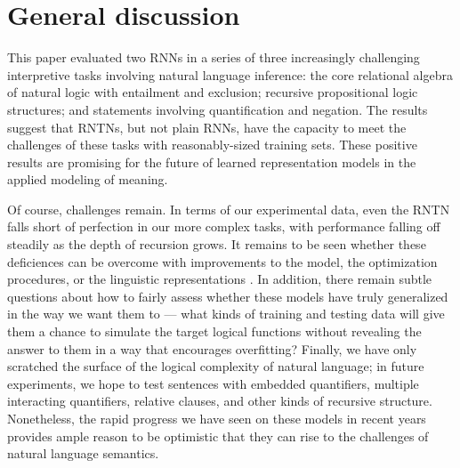 \section{General discussion}\label{sec:discussion}

This paper evaluated two RNNs in a series of three increasingly
challenging interpretive tasks involving natural language inference:
the core relational algebra of natural logic with entailment and
exclusion; recursive propositional logic structures; and statements
involving quantification and negation. The results suggest that RNTNs,
but not plain RNNs, have the capacity to meet the challenges of these
tasks with reasonably-sized training sets. These positive results are
promising for the future of learned representation models in the
applied modeling of meaning.

Of course, challenges remain. In terms of our experimental data, even
the RNTN falls short of perfection in our more complex tasks, with
performance falling off steadily as the depth of recursion grows. It
remains to be seen whether these deficiences can be overcome with
improvements to the model, the optimization procedures, or the
linguistic representations
\cite{sochergrounded,kalchbrenner2014convolutional}. In addition,
there remain subtle questions about how to fairly assess whether these
models have truly generalized in the way we want them to --- what
kinds of training and testing data will give them a chance to simulate
the target logical functions without revealing the answer to them in a
way that encourages overfitting? Finally, we have only scratched the
surface of the logical complexity of natural language; in future
experiments, we hope to test sentences with embedded quantifiers,
multiple interacting quantifiers, relative clauses, and other kinds of
recursive structure. Nonetheless, the rapid progress we have seen on
these models in recent years provides ample reason to be optimistic
that they can rise to the challenges of natural language semantics.



